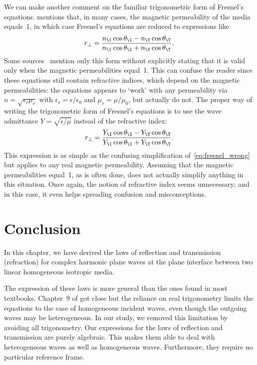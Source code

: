\begin{refsection}
We can make another comment on the familiar trigonometric form of Fresnel's equations.
\citeauthor{hecht2002optics} mentions that, in many cases, the magnetic permeability of the media equals~1, in which case Fresnel's equations are reduced to expressions like
\begin{equation}
    r_\perp
    =
    \frac{
        n_\I \cos \theta_\I
        -
        n_\T \cos \theta_\T
    }{
        n_\I \cos \theta_\I
        +
        n_\T \cos \theta_\T
    }
    \label{eq:fresnel_wrong}
    \text{.}
\end{equation}
Some sources~\parencite[for instance][]{wiki:fresnel} mention only this form without explicitly stating that it is valid only when the magnetic permeabilities equal~1.
This can confuse the reader since these equations still contain refractive indices, which depend on the magnetic permeabilities: the equations appears to `work' with any permeability via $n=\sqrt{\epsilon_r \mu_r}$ with $\epsilon_r = \epsilon / \epsilon_0$ and $\mu_r = \mu / \mu_0$, but actually do not.
The proper way of writing the trigonometric form of Fresnel's equations is to use the wave admittance $Y=\sqrt{\epsilon/\mu}$ instead of the refractive index:
\begin{equation}
    r_\perp
    =
    \frac{
        Y_\I \cos \theta_\I
        -
        Y_\T \cos \theta_\T
    }{
        Y_\I \cos \theta_\I
        +
        Y_\T \cos \theta_\T
    }
    \text{.}
\end{equation}
This expression is as simple as the confusing simplification of~\cref{eq:fresnel_wrong} but applies to any real magnetic permeability.
Assuming that the magnetic permeabilities equal~1, as is often done, does not actually simplify anything in this situation.
Once again, the notion of refractive index seems unnecessary; and in this case, it even helps spreading confusion and misconceptions.





\FloatBarrier
\section{Conclusion}
In this chapter, we have derived the laws of reflection and transmission (refraction) for complex harmonic plane waves at the plane interface between two linear homogeneous isotropic media.

The expression of these laws is more general than the ones found in most textbooks.
Chapter~9 of \textcite{stratton1941electromagnetic} got close but the reliance on real trigonometry limits the equations to the case of homogeneous incident waves, even though the outgoing waves may be heterogeneous.
In our study, we removed this limitation by avoiding all trigonometry.
Our expressions for the laws of reflection and transmission are purely algebraic.
This makes them able to deal with heterogeneous waves as well as homogeneous waves.
Furthermore, they require no particular reference frame.


\end{refsection}
